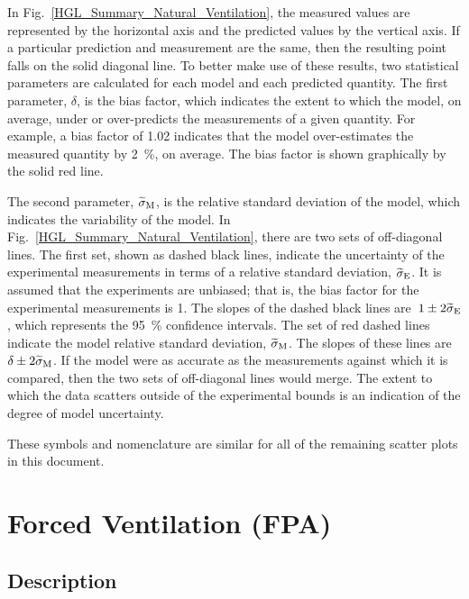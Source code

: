In Fig.~\ref{HGL_Summary_Natural_Ventilation}, the measured values are represented by the horizontal axis and the predicted values by the vertical axis. If a particular prediction and measurement are the same, then the resulting point falls on the solid diagonal line. To better make use of these results, two statistical parameters are calculated for each model and each predicted quantity. The first parameter, $\delta$, is the bias factor, which indicates the extent to which the model, on average, under or over-predicts the measurements of a given quantity. For example, a bias factor of 1.02 indicates that the model over-estimates the measured quantity by \SI{2}{\percent}, on average. The bias factor is shown graphically by the solid red line.

The second parameter, $\widetilde{\sigma}\sb{M}$, is the relative standard deviation of the model, which indicates the variability of the model. In Fig.~\ref{HGL_Summary_Natural_Ventilation}, there are two sets of off-diagonal lines. The first set, shown as dashed black lines, indicate the uncertainty of the experimental measurements in terms of a relative standard deviation, $\widetilde{\sigma}\sb{E}$. It is assumed that the experiments are unbiased; that is, the bias factor for the experimental measurements is 1. The slopes of the dashed black lines are~$1 \pm 2\widetilde{\sigma}\sb{E}$, which represents the \SI{95}{\percent} confidence intervals. The set of red dashed lines indicate the model relative standard deviation, $\widetilde{\sigma}\sb{M}$. The slopes of these lines are~$\delta \pm 2\widetilde{\sigma}\sb{M}$. If the model were as accurate as the measurements against which it is compared, then the two sets of off-diagonal lines would merge. The extent to which the data scatters outside of the experimental bounds is an indication of the degree of model uncertainty.

These symbols and nomenclature are similar for all of the remaining scatter plots in this document.


\clearpage


\section{Forced Ventilation (FPA)}

\subsection*{Description}


